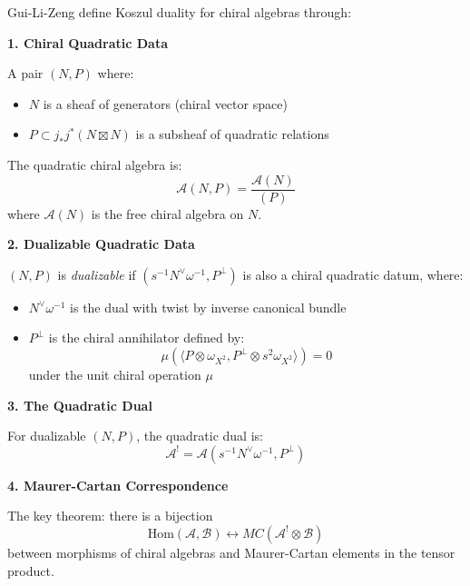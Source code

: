 \begin{framework}
\label{framework:glz}
Gui-Li-Zeng define Koszul duality for chiral algebras through:

\textbf{1. Chiral Quadratic Data}

A pair $(N, P)$ where:
\begin{itemize}
\item $N$ is a sheaf of generators (chiral vector space)
\item $P \subset j_* j^* (N \boxtimes N)$ is a subsheaf of quadratic relations
\end{itemize}

The quadratic chiral algebra is:
$$\mathcal{A}(N, P) = \frac{\mathcal{A}(N)}{(P)}$$
where $\mathcal{A}(N)$ is the free chiral algebra on $N$.

\textbf{2. Dualizable Quadratic Data}

$(N, P)$ is \emph{dualizable} if $(s^{-1}N^{\vee}\omega^{-1}, P^{\perp})$ is also a chiral 
quadratic datum, where:
\begin{itemize}
\item $N^{\vee}\omega^{-1}$ is the dual with twist by inverse canonical bundle
\item $P^{\perp}$ is the chiral annihilator defined by:
      $$\mu(\langle P \otimes \omega_{X^2}, P^{\perp} \otimes s^2\omega_{X^2}\rangle) = 0$$
      under the unit chiral operation $\mu$
\end{itemize}

\textbf{3. The Quadratic Dual}

For dualizable $(N, P)$, the quadratic dual is:
$$\mathcal{A}^! = \mathcal{A}(s^{-1}N^{\vee}\omega^{-1}, P^{\perp})$$

\textbf{4. Maurer-Cartan Correspondence}

The key theorem: there is a bijection
$$\text{Hom}(\mathcal{A}, \mathcal{B}) \leftrightarrow MC(\mathcal{A}^! \otimes \mathcal{B})$$
between morphisms of chiral algebras and Maurer-Cartan elements in the tensor product.
\end{framework}

